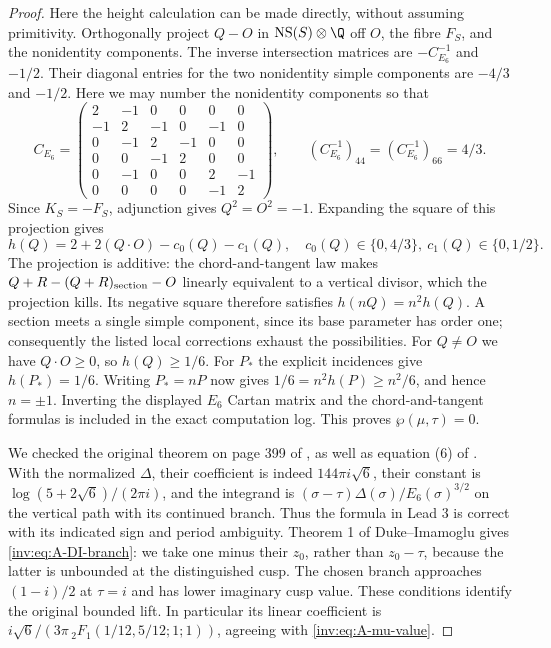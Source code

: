 \begin{proof}
Here the height calculation can be made directly, without assuming
primitivity.  Orthogonally project $Q-O$ in
$\operatorname{NS}(S)\otimes\Q$ off $O$, the fibre $F_S$, and the
nonidentity components.  The inverse intersection matrices are
$-C_{E_6}^{-1}$ and $-1/2$.  Their diagonal entries for the two
nonidentity simple components are $-4/3$ and $-1/2$.
Here we may number the nonidentity components so that
\[
C_{E_6}=\begin{pmatrix}
2&-1&0&0&0&0\\
-1&2&-1&0&-1&0\\
0&-1&2&-1&0&0\\
0&0&-1&2&0&0\\
0&-1&0&0&2&-1\\
0&0&0&0&-1&2
\end{pmatrix},\qquad
(C_{E_6}^{-1})_{44}=(C_{E_6}^{-1})_{66}=4/3.
\]
Since $K_S=-F_S$, adjunction gives $Q^2=O^2=-1$.  Expanding the
square of this projection gives
\[
h(Q)=2+2(Q\cdot O)-c_0(Q)-c_1(Q),\quad
c_0(Q)\in\{0,4/3\},\ c_1(Q)\in\{0,1/2\}.
\]
The projection is additive: the chord-and-tangent law makes
$Q+R-(Q+R)_{\rm section}-O$ linearly equivalent to a vertical
divisor, which the projection kills.  Its negative square therefore
satisfies $h(nQ)=n^2h(Q)$.  A section meets a single simple
component, since its base parameter has order one; consequently
the listed local corrections exhaust the possibilities.
For $Q\ne O$ we have $Q\cdot O\ge0$, so $h(Q)\ge1/6$.
For $P_*$ the explicit incidences give $h(P_*)=1/6$.
Writing $P_*=nP$ now gives $1/6=n^2h(P)\ge n^2/6$, and hence
$n=\pm1$.  Inverting the displayed $E_6$ Cartan matrix and the
chord-and-tangent formulas is included in the exact computation log.
This proves $\wp(\mu,\tau)=0$.

We checked the original theorem on page 399 of
\citet{EichlerZagier1982}, as well as equation (6) of
\citet{DukeImamoglu2008}.  With the normalized $\Delta$, their
coefficient is indeed $144\pi i\sqrt6$, their constant is
$\log(5+2\sqrt6)/(2\pi i)$, and the integrand is
$(\sigma-\tau)\Delta(\sigma)/E_6(\sigma)^{3/2}$ on the vertical
path with its continued branch.  Thus the formula in Lead 3 is
correct with its indicated sign and period ambiguity.  Theorem 1
of Duke--Imamoglu gives \eqref{inv:eq:A-DI-branch}: we take one minus
their $z_0$, rather than $z_0-\tau$, because the latter is unbounded
at the distinguished cusp.  The chosen branch approaches
$(1-i)/2$ at $\tau=i$ and has lower imaginary cusp value.
These conditions identify the original bounded lift.  In particular
its linear coefficient is
$i\sqrt6/(3\pi\,{}_2F_1(1/12,5/12;1;1))$, agreeing with
\eqref{inv:eq:A-mu-value}.


\end{proof}
